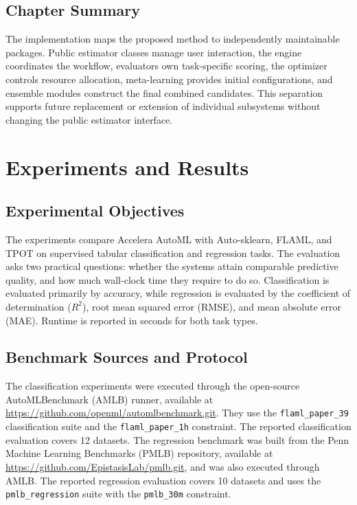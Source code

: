 \documentclass[12pt,a4paper,oneside]{report}
\newcommand{\systemname}{Accelera AutoML}
\newcommand{\modulepath}[1]{\texttt{\footnotesize #1}}
\begin{document}
\section{Chapter Summary}

The implementation maps the proposed method to independently maintainable
packages. Public estimator classes manage user interaction, the engine
coordinates the workflow, evaluators own task-specific scoring, the optimizer
controls resource allocation, meta-learning provides initial configurations,
and ensemble modules construct the final combined candidates. This separation
supports future replacement or extension of individual subsystems without
changing the public estimator interface.

\chapter{Experiments and Results}
\label{chap:experiments-results}

\section{Experimental Objectives}

The experiments compare \systemname{} with Auto-sklearn, FLAML, and TPOT on
supervised tabular classification and regression tasks. The evaluation asks
two practical questions: whether the systems attain comparable predictive
quality, and how much wall-clock time they require to do so. Classification is
evaluated primarily by accuracy, while regression is evaluated by the
coefficient of determination ($R^2$), root mean squared error (RMSE), and mean
absolute error (MAE). Runtime is reported in seconds for both task types.

\section{Benchmark Sources and Protocol}

The classification experiments were executed through the open-source
AutoMLBenchmark (AMLB) runner, available at
\url{https://github.com/openml/automlbenchmark.git}. They use the
\modulepath{flaml\_paper\_39} classification suite and the
\modulepath{flaml\_paper\_1h} constraint. The reported classification
evaluation covers 12 datasets. The regression benchmark was built from the
Penn Machine Learning Benchmarks (PMLB) repository, available at
\url{https://github.com/EpistasisLab/pmlb.git}, and was also executed through
AMLB. The reported regression evaluation covers 10 datasets and uses the
\modulepath{pmlb\_regression} suite with the \modulepath{pmlb\_30m}
constraint.
\end{document}
